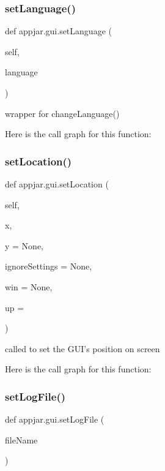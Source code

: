 \begin{DoxyVerb}
\subsubsection{\texorpdfstring{set\+Language()}{setLanguage()}}
{\footnotesize\ttfamily def appjar.\+gui.\+set\+Language (\begin{DoxyParamCaption}\item[{}]{self,  }\item[{}]{language }\end{DoxyParamCaption})}

\begin{DoxyVerb}wrapper for changeLanguage() \end{DoxyVerb}
 Here is the call graph for this function\+:
\mbox{\label{classappjar_1_1gui_ac8a8c2c4163d7ccb10d7749d6637046c}} 
\subsubsection{\texorpdfstring{set\+Location()}{setLocation()}}
{\footnotesize\ttfamily def appjar.\+gui.\+set\+Location (\begin{DoxyParamCaption}\item[{}]{self,  }\item[{}]{x,  }\item[{}]{y = {\ttfamily None},  }\item[{}]{ignore\+Settings = {\ttfamily None},  }\item[{}]{win = {\ttfamily None},  }\item[{}]{up = {} }\end{DoxyParamCaption})}

\begin{DoxyVerb}called to set the GUI's position on screen \end{DoxyVerb}
 Here is the call graph for this function\+:
\mbox{\label{classappjar_1_1gui_ae007726ee968ef08e88cbe0f30f8721f}} 
\subsubsection{\texorpdfstring{set\+Log\+File()}{setLogFile()}}
{\footnotesize\ttfamily def appjar.\+gui.\+set\+Log\+File (\begin{DoxyParamCaption}\item[{}]{file\+Name }\end{DoxyParamCaption})\hspace{0.3cm}{\ttfamily [static]}}




\end{DoxyVerb}
